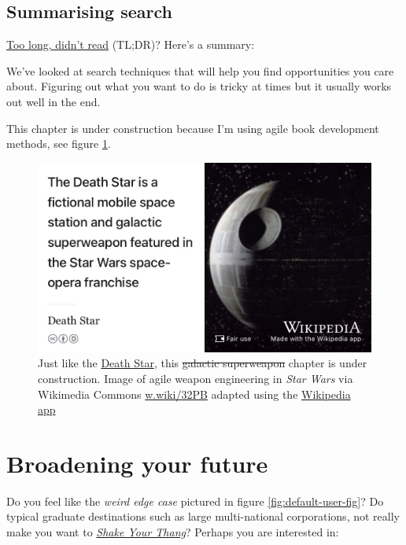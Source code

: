 \documentclass[
]{book}
\begin{document}
\hypertarget{tldr8}{%
\section{Summarising search}\label{tldr8}}

\href{https://en.wiktionary.org/wiki/too_long;_didn\%27t_read}{Too long, didn't read} (TL;DR)? Here's a summary:

We've looked at search techniques that will help you find opportunities you care about. Figuring out what you want to do is tricky at times but it usually works out well in the end.

This chapter is under construction because I'm using agile book development methods, see figure \ref{fig:deathstar5-fig}.

\begin{figure}

{\centering \includegraphics[width=0.99\linewidth]{images/DeathStar2} 

}

\caption{Just like the \href{https://en.wikipedia.org/wiki/Death_Star}{Death Star}, this \sout{galactic superweapon} chapter is under construction. Image of agile weapon engineering in \emph{Star Wars} via Wikimedia Commons \href{https://w.wiki/32PB}{w.wiki/32PB} adapted using the \href{https://apps.apple.com/gb/app/wikipedia/id324715238}{Wikipedia app}}\label{fig:deathstar5-fig}
\end{figure}

\hypertarget{broadening}{%
\chapter{Broadening your future}\label{broadening}}

Do you feel like the \emph{weird edge case} pictured in figure \ref{fig:default-user-fig}? Do typical graduate destinations such as large multi-national corporations, not really make you want to \emph{\href{https://en.wikipedia.org/wiki/Shake_Your_Thang}{Shake Your Thang}}? \citep{saltnpepa} Perhaps you are interested in:
\end{document}
